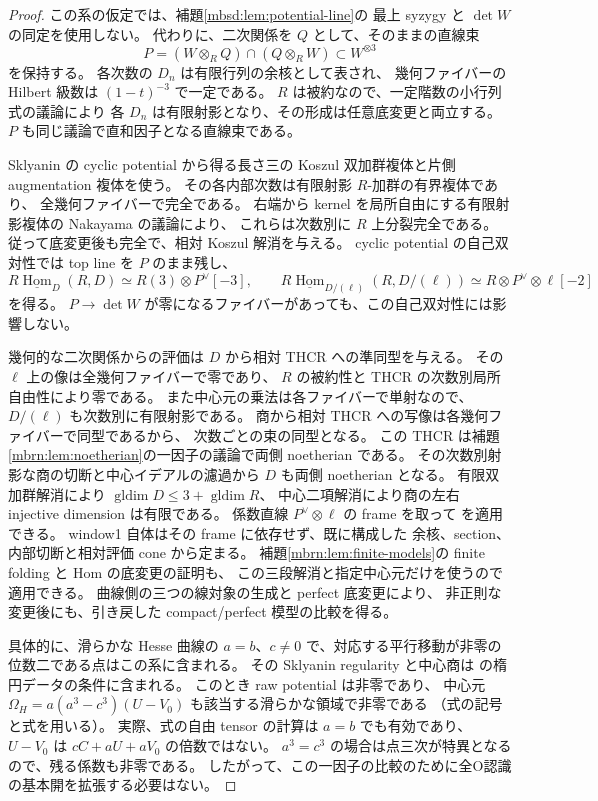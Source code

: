 \begin{proof}
この系の仮定では、補題\ref{mbsd:lem:potential-line}の
最上 syzygy と $\det W$ の同定を使用しない。
代わりに、二次関係を $Q$ として、そのままの直線束
\[
 P=(W\otimes_RQ)\cap(Q\otimes_RW)\subset W^{\otimes3}
\]
を保持する。
各次数の $D_n$ は有限行列の余核として表され、
幾何ファイバーの Hilbert 級数は $(1-t)^{-3}$ で一定である。
$R$ は被約なので、一定階数の小行列式の議論により
各 $D_n$ は有限射影となり、その形成は任意底変更と両立する。
$P$ も同じ議論で直和因子となる直線束である。

Sklyanin の cyclic potential から得る長さ三の
Koszul 双加群複体と片側 augmentation 複体を使う。
その各内部次数は有限射影 $R$-加群の有界複体であり、
全幾何ファイバーで完全である。
右端から kernel を局所自由にする有限射影複体の Nakayama の議論により、
これらは次数別に $R$ 上分裂完全である。
従って底変更後も完全で、相対 Koszul 解消を与える。
cyclic potential の自己双対性では top line を $P$ のまま残し、
\[
 R\underline{\operatorname{Hom}}_D(R,D)
       \simeq R(3)\otimes P^\vee[-3],\qquad
 R\underline{\operatorname{Hom}}_{D/(\ell)}(R,D/(\ell))
       \simeq R\otimes P^\vee\otimes\ell[-2]
\]
を得る。
$P\to\det W$ が零になるファイバーがあっても、この自己双対性には影響しない。

幾何的な二次関係からの評価は $D$ から相対 THCR への準同型を与える。
その $\ell$ 上の像は全幾何ファイバーで零であり、
$R$ の被約性と THCR の次数別局所自由性により零である。
また中心元の乗法は各ファイバーで単射なので、
$D/(\ell)$ も次数別に有限射影である。
商から相対 THCR への写像は各幾何ファイバーで同型であるから、
次数ごとの束の同型となる。
この THCR は補題\ref{mbrn:lem:noetherian}の一因子の議論で両側 noetherian である。
その次数別射影な商の切断と中心イデアルの濾過から $D$ も両側 noetherian となる。
有限双加群解消により $\operatorname{gldim}D\leq3+\operatorname{gldim}R$、
中心二項解消により商の左右 injective dimension は有限である。
係数直線 $P^\vee\otimes\ell$ の frame を取って
\cite[Definition~5.1, Remark~5.2, Theorem~6.4(3)]{LP-BS}を適用できる。
window1 自体はその frame に依存せず、既に構成した
余核、section、内部切断と相対評価 cone から定まる。
補題\ref{mbrn:lem:finite-models}の finite folding と Hom の底変更の証明も、
この三段解消と指定中心元だけを使うので適用できる。
曲線側の三つの線対象の生成と perfect 底変更により、
非正則な変更後にも、引き戻した compact/perfect 模型の比較を得る。

具体的に、滑らかな Hesse 曲線の
$a=b$、$c\ne0$ で、対応する平行移動が非零の位数二である点はこの系に含まれる。
その Sklyanin regularity と中心商は
\cite[Theorems~6.6, 6.8]{GRSklyaninATV}
\cite[Section~1]{GRSklyaninST}の楕円データの条件に含まれる。
このとき raw potential は非零であり、
中心元 $\Omega_H=a(a^3-c^3)(U-V_0)$ も該当する滑らかな領域で非零である
（式の記号と式を用いる）。
実際、式の自由 tensor の計算は $a=b$ でも有効であり、
$U-V_0$ は $cC+aU+aV_0$ の倍数ではない。
$a^3=c^3$ の場合は点三次が特異となるので、残る係数も非零である。
したがって、この一因子の比較のために全O認識の基本開を拡張する必要はない。
\end{proof}

